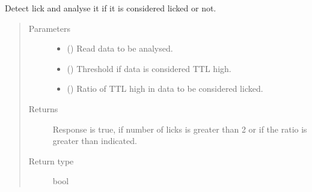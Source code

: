 \documentclass[letterpaper,10pt,english]{sphinxmanual}
\begin{document}

\begin{fulllineitems}
\label{\detokenize{NoSeMazeController/TrialLogic:TrialLogic.TrialConditions.lick_detect}}
\pysigstartsignatures
{}
\pysigstopsignatures
\sphinxAtStartPar
Detect lick and analyse it if it is considered licked or not.
\begin{quote}\begin{description}
\item[{Parameters}] \leavevmode\begin{itemize}
\item {} 
\sphinxAtStartPar
{} () \textendash{} Read data to be analysed.

\item {} 
\sphinxAtStartPar
{} () \textendash{} Threshold if data is considered TTL high.

\item {} 
\sphinxAtStartPar
{} () \textendash{} Ratio of TTL high in data to be considered licked.

\end{itemize}

\item[{Returns}] \leavevmode
\sphinxAtStartPar
{} \textendash{} Response is true, if number of licks is greater than 2 or if the ratio
is greater than indicated.

\item[{Return type}] \leavevmode
\sphinxAtStartPar
bool

\end{description}\end{quote}

\end{fulllineitems}

\end{document}
